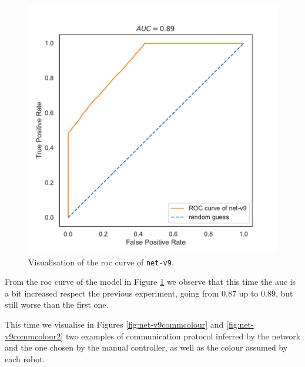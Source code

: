 \begin{figure}[!htb]
	\centering
	\includegraphics[width=.47\textwidth]{contents/images/net-v9/roc-net-v9(a)}%
	\caption[Evaluation of the \gls{roc} of \texttt{net-v9}.]{Visualisation of the 
		\gls{roc} curve of \texttt{net-v9}.}
	\label{fig:net-v9auc}
\end{figure}

\bigskip
From the \gls{roc} curve of the model in Figure \ref{fig:net-v9auc}  we observe 
that this time the \gls{auc} is a bit increased respect the previous experiment, 
going from $0.87$ up to $0.89$, but still worse than the first one.

This time we visualise in Figures \ref{fig:net-v9commcolour} and 
\ref{fig:net-v9commcolour2} two examples of communication protocol inferred 
by the network and the one chosen by the manual controller, as well as the colour 
assumed by each robot.

